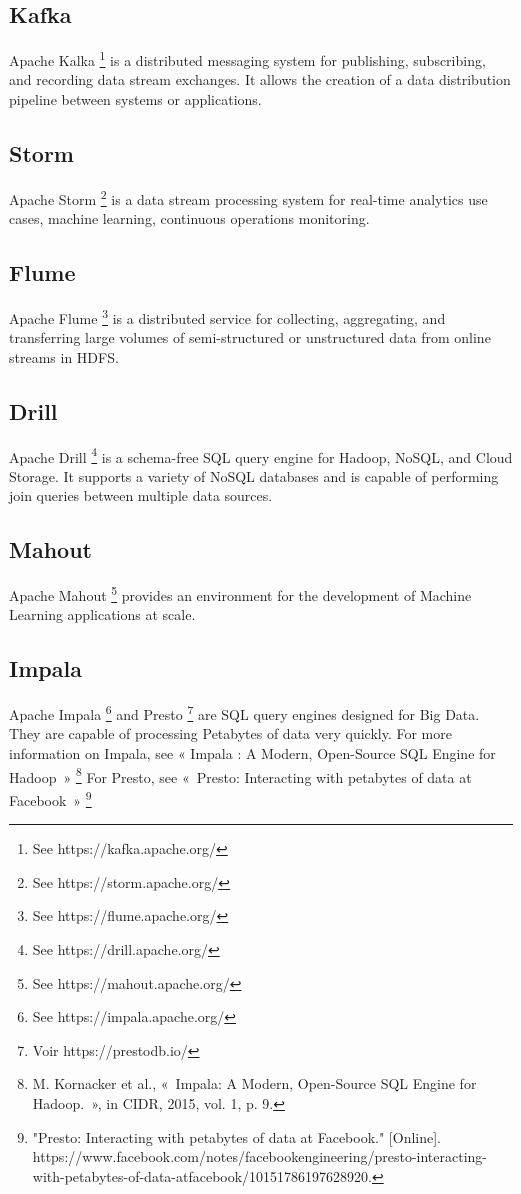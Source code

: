 \documentclass[12pt,english]{book}
\begin{document}
\subsection{Kafka}

Apache Kalka \footnote{See https://kafka.apache.org/} is a distributed messaging system for publishing, subscribing, and recording data stream exchanges.
It allows the creation of a data distribution pipeline between systems or applications. 

\subsection{Storm}

Apache Storm \footnote{See https://storm.apache.org/} is a data stream processing system for real-time analytics use cases, machine learning, continuous operations monitoring.

\subsection{Flume}

Apache Flume \footnote{See https://flume.apache.org/} is a distributed service for collecting, aggregating, and transferring large volumes of semi-structured or unstructured data from online streams in HDFS.

\subsection{Drill}

Apache Drill \footnote{See https://drill.apache.org/} is a schema-free SQL query engine for Hadoop, NoSQL, and Cloud Storage.
It supports a variety of NoSQL databases and is capable of performing join queries between multiple data sources.   

\subsection{Mahout}

Apache Mahout \footnote{See https://mahout.apache.org/} provides an environment for the development of Machine Learning applications at scale.

\subsection{Impala}

Apache Impala \footnote{See https://impala.apache.org/} and Presto \footnote{Voir https://prestodb.io/} are SQL query engines designed for Big Data.
They are capable of processing Petabytes of data very quickly. 
For more information on Impala, see « Impala : A Modern, Open-Source SQL Engine for Hadoop » \footnote{M. Kornacker et al., « Impala: A Modern, Open-Source SQL Engine for Hadoop. », in CIDR, 2015, vol. 1, p. 9.}
For Presto, see « Presto: Interacting with petabytes of data at Facebook » \footnote{"Presto: Interacting with petabytes of data at Facebook." [Online]. https://www.facebook.com/notes/facebookengineering/presto-interacting-with-petabytes-of-data-atfacebook/10151786197628920.}
\end{document}
